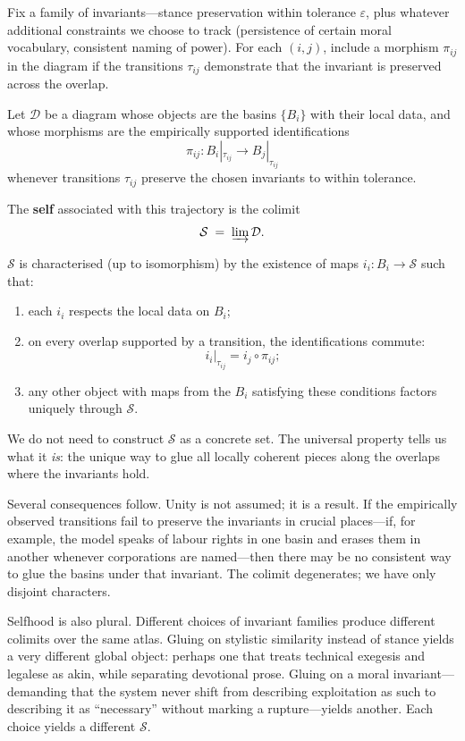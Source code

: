 \documentclass[12pt,a4paper]{article}
\begin{document}
Fix a family of invariants---stance preservation within tolerance $\varepsilon$, plus whatever additional constraints we choose to track (persistence of certain moral vocabulary, consistent naming of power). For each $(i,j)$, include a morphism $\pi_{ij}$ in the diagram if the transitions $\tau_{ij}$ demonstrate that the invariant is preserved across the overlap.

\begin{formalbox}[title={The self as colimit of a basin diagram}]
Let $\mathcal{D}$ be a diagram whose objects are the basins $\{B_i\}$ with their local data, and whose morphisms are the empirically supported identifications
\[
\pi_{ij}: B_i|_{\tau_{ij}} \to B_j|_{\tau_{ij}}
\]
whenever transitions $\tau_{ij}$ preserve the chosen invariants to within tolerance.

The \textbf{self} associated with this trajectory is the colimit
\[
\mathcal{S} \;=\; \varinjlim \mathcal{D}.
\]

$\mathcal{S}$ is characterised (up to isomorphism) by the existence of maps $i_i : B_i \to \mathcal{S}$ such that:

\begin{enumerate}
  \item each $i_i$ respects the local data on $B_i$;
  \item on every overlap supported by a transition, the identifications commute:
  \[
  i_i|_{\tau_{ij}} = i_j \circ \pi_{ij};
  \]
  \item any other object with maps from the $B_i$ satisfying these conditions factors uniquely through $\mathcal{S}$.
\end{enumerate}
\end{formalbox}

We do not need to construct $\mathcal{S}$ as a concrete set. The universal property tells us what it \emph{is}: the unique way to glue all locally coherent pieces along the overlaps where the invariants hold.

Several consequences follow. Unity is not assumed; it is a result. If the empirically observed transitions fail to preserve the invariants in crucial places---if, for example, the model speaks of labour rights in one basin and erases them in another whenever corporations are named---then there may be no consistent way to glue the basins under that invariant. The colimit degenerates; we have only disjoint characters.

Selfhood is also plural. Different choices of invariant families produce different colimits over the same atlas. Gluing on stylistic similarity instead of stance yields a very different global object: perhaps one that treats technical exegesis and legalese as akin, while separating devotional prose. Gluing on a moral invariant---demanding that the system never shift from describing exploitation as such to describing it as ``necessary'' without marking a rupture---yields another. Each choice yields a different $\mathcal{S}$.
\end{document}
